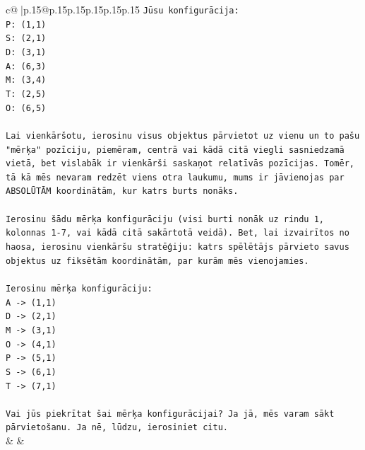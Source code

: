 \documentclass{article}
\begin{document}
{\begin{supertabular}{c@{$\;$}|p{.15\linewidth}@{}p{.15\linewidth}p{.15\linewidth}p{.15\linewidth}p{.15\linewidth}p{.15\linewidth}}
{{{\texttt{Jūsu konfigurācija:} \\
\texttt{P: (1,1)} \\
\texttt{S: (2,1)} \\
\texttt{D: (3,1)} \\
\texttt{A: (6,3)} \\
\texttt{M: (3,4)} \\
\texttt{T: (2,5)} \\
\texttt{O: (6,5)} \\
\\ 
\texttt{Lai vienkāršotu, ierosinu visus objektus pārvietot uz vienu un to pašu "mērķa" pozīciju, piemēram, centrā vai kādā citā viegli sasniedzamā vietā, bet vislabāk ir vienkārši saskaņot relatīvās pozīcijas. Tomēr, tā kā mēs nevaram redzēt viens otra laukumu, mums ir jāvienojas par ABSOLŪTĀM koordinātām, kur katrs burts nonāks.} \\
\\ 
\texttt{Ierosinu šādu mērķa konfigurāciju (visi burti nonāk uz rindu 1, kolonnas 1{-}7, vai kādā citā sakārtotā veidā). Bet, lai izvairītos no haosa, ierosinu vienkāršu stratēģiju: katrs spēlētājs pārvieto savus objektus uz fiksētām koordinātām, par kurām mēs vienojamies.} \\
\\ 
\texttt{Ierosinu mērķa konfigurāciju:} \\
\texttt{A {-}> (1,1)} \\
\texttt{D {-}> (2,1)} \\
\texttt{M {-}> (3,1)} \\
\texttt{O {-}> (4,1)} \\
\texttt{P {-}> (5,1)} \\
\texttt{S {-}> (6,1)} \\
\texttt{T {-}> (7,1)} \\
\\ 
\texttt{Vai jūs piekrītat šai mērķa konfigurācijai? Ja jā, mēs varam sākt pārvietošanu. Ja nē, lūdzu, ierosiniet citu.} \\
            }
        }
    }
    & & \\ \\


\end{supertabular}}
\end{document}
